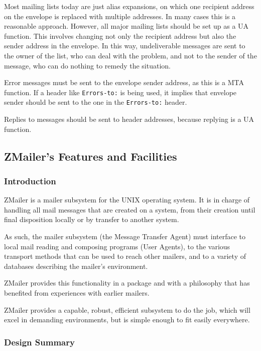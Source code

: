 Most mailing lists today are just alias expansions, on which one recipient 
address on the envelope is replaced with multiple addresses. In many cases 
this is a reasonable approach. However, all major mailing lists should be 
set up as a UA function. This involves changing not only the recipient 
address but also the sender address in the envelope. In this way, 
undeliverable messages are sent to the owner of the list, who can deal 
with the problem, and not to the sender of the message, who can do nothing 
to remedy the situation.

Error messages must be sent to the envelope sender address, as this is a 
MTA function. If a header like {\tt Errors-to:} is being used, it implies 
that envelope sender should be sent to the one in the {\tt Errors-to:} header.

Replies to messages should be sent to header addresses, because replying is 
a UA function.




\subsection{ZMailer's Features and Facilities}




\subsubsection{Introduction}

ZMailer is a mailer subsystem for the UNIX operating system.
It is in charge of handling all mail messages that are created
on a system, from their creation until final disposition locally
or by transfer to another system.

As such, the mailer subsystem (the Message Transfer Agent) must
interface to local mail reading and composing programs (User Agents),
to the various transport methods that can be used to reach other mailers,
and to a variety of databases describing the mailer's environment.

ZMailer provides this functionality in a package and with a philosophy
that has benefited from experiences with earlier mailers.

ZMailer provides a capable, robust, efficient subsystem to do the job,
which will excel in demanding environments, but is simple enough to
fit easily everywhere.


\subsubsection{Design Summary}


